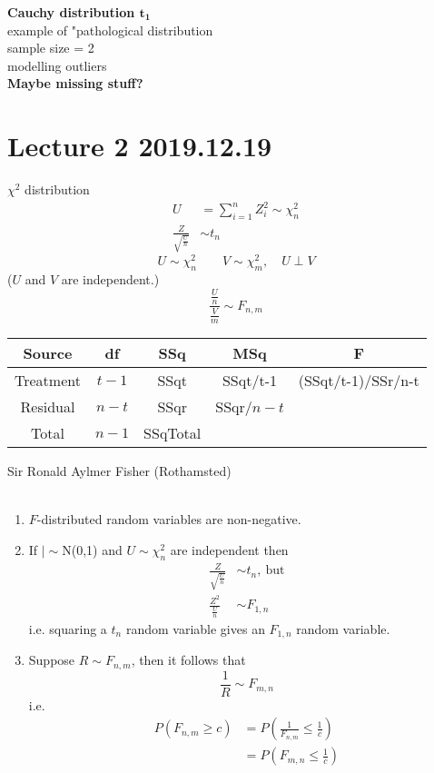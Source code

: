 \documentclass{article}
\theoremstyle{definition}
\theoremstyle{remark}
\theoremstyle{example}
\begin{document}
	\textbf{Cauchy distribution $\mathbf{t_1}$}\\
	example of "pathological distribution\\
	sample size = 2\\
	modelling outliers\\
	\textbf{Maybe missing stuff? }
	
	\section*{Lecture 2 2019.12.19}
	$\chi^2$ distribution\\
	\begin{align*}
		U&=\sum_{i=1}^{n}Z_i^2 \sim \chi^2_n\\
		\frac{Z}{\sqrt{\frac{U}{n}}}&\sim t_n
	\end{align*}
	\[ U \sim \chi^2_n\qquad V \sim \chi^2_m,\quad U \perp V \]
	($U$ and $V$ are independent.)
	\[ \frac{\frac{U}{n}}{\frac{V}{m}} \sim F_{n,m} \]
	
	\begin{center}
		\begin{tabular}{ c | c c c c } 
			Source & df & SSq  & MSq & F\\
			\hline
			Treatment & $t-1$ & SSqt &  SSqt/t-1 & (SSqt/t-1)/SSr/n-t\\ 
			Residual & $n-t$ & SSqr & SSqr/$n-t$ \\
			\hline
			Total & $n-1$ & SSqTotal
		\end{tabular}
	\end{center}
	Sir Ronald Aylmer Fisher (Rothamsted)\\
	\\
	\begin{enumerate}
		\item $F$-distributed random variables are non-negative.
		\item If $|\sim$N(0,1) and $U\sim\chi^2_n$ are independent then \begin{align*}
			\frac{Z}{\sqrt{\frac{U}{n}}} &\sim t_n,\ \mathrm{but}\\
			\frac{Z^2}{\frac{U}{n}}  & \sim F_{1,n}
		\end{align*}
		i.e. squaring a $t_n$ random variable gives an $F_{1,n}$ random variable.
		\item Suppose $R \sim F_{n,m}$, then it follows that \[\frac{1}{R}\sim F_{m,n}  \] i.e.
		\begin{align*}
			P(F_{n,m} \geq c)&=P\left(\frac{1}{F_{n,m}} \leq \frac1c\right)\\
			&= P\left( F_{m,n} \leq \frac1c \right)
		\end{align*}
	\end{enumerate}
\end{document}
